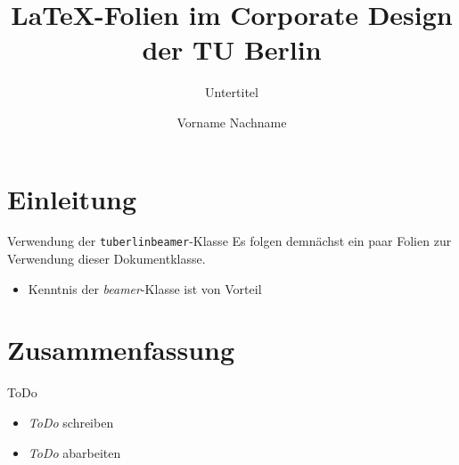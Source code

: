 \documentclass[Nike]{tuberlinbeamer}
\title{\LaTeX-Folien im Corporate Design der TU Berlin}
\subtitle{Untertitel}
\author[Kurzname]{Vorname Nachname}
\institute{Technische Universität Berlin}
\begin{document}
\begin{frame}
\maketitle
\end{frame}


\begin{frame}
\tableofcontents
\end{frame}

\section{Einleitung}

\begin{frame}[fragile]{Verwendung der \texttt{tuberlinbeamer}-Klasse}
Es folgen demnächst ein paar Folien zur Verwendung dieser Dokumentklasse.
\begin{itemize}
\item Kenntnis der \emph{beamer}-Klasse ist von Vorteil
\end{itemize}
\end{frame}

\section{Zusammenfassung}

\begin{frame}{ToDo}
\begin{itemize}
\item \emph{ToDo} schreiben
\item \emph{ToDo} abarbeiten
\end{itemize}
\end{frame}
\end{document}
